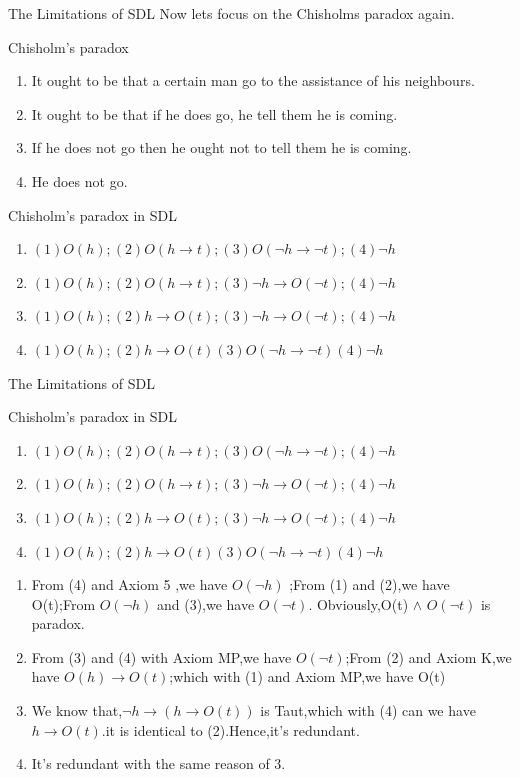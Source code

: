 \documentclass{beamer}
\begin{document}
\begin{frame}{The Limitations of SDL}
Now lets focus on the Chisholms paradox again.
\begin{block}{Chisholm's paradox}
\begin{enumerate}
\item  It ought to be that a certain man go to the assistance of his neighbours.
\item  It ought to be that if he does go, he tell them he is coming.
\item If he does not go then he ought not to tell them he is coming.
\item He does not go.
\end{enumerate}
\end{block}
\begin{block}{Chisholm's paradox in SDL}
\begin{enumerate}
\item $(1)O(h);(2)O(h\to t);(3)O(\neg h\to \neg t);(4) \neg h$
\item $(1)O(h);(2)O(h \to t);(3) \neg h \to O (\neg t); (4) \neg h$
\item $(1)O(h);(2)h\to O(t);(3)\neg h \to O(\neg t) ;(4)\neg h $
\item $ (1)O(h);(2)h\to O(t)(3)O(\neg h\to \neg t)(4)\neg h$
\end{enumerate}
\end{block}
\end{frame}
\begin{frame}{The Limitations of SDL}
\begin{block}{Chisholm's paradox in SDL}
\begin{enumerate}
\item $(1)O(h);(2)O(h\to t);(3)O(\neg h\to \neg t);(4) \neg h$
\item $(1)O(h);(2)O(h \to t);(3) \neg h \to O (\neg t); (4) \neg h$
\item $(1)O(h);(2)h\to O(t);(3)\neg h \to O(\neg t) ;(4)\neg h $
\item $ (1)O(h);(2)h\to O(t)(3)O(\neg h\to \neg t)(4)\neg h$
\end{enumerate}
\end{block}
\begin{enumerate}
\item From (4) and Axiom 5 ,we have $O(\neg h) $ ;From (1) and (2),we have O(t);From $O(\neg h)$ and (3),we have $ O(\neg t)$. Obviously,O(t) $\wedge$ $O(\neg t)$ is paradox.
\item From (3) and (4) with Axiom MP,we have $O(\neg t)$;From (2) and Axiom K,we have $O(h)\to O(t) $;which with (1) and Axiom MP,we have O(t)
\item We know that,$ \neg h \to (h \to O(t))$ is Taut,which with (4) can we have $ h \to O(t)$.it is identical to (2).Hence,it's redundant.
\item It's redundant with the same reason of 3.
\end{enumerate}
\end{frame}
\end{document}
